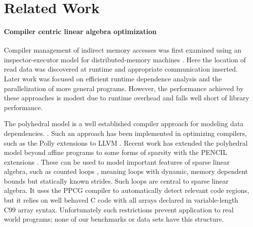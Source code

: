 \section{Related Work}
\label{sec:relatedwork}
\paragraph{Compiler centric linear algebra optimization} Compiler
management of indirect memory accesses was first examined using an
inspector-executor model for distributed-memory machines
\cite{Baxter:1989:RPS:72935.72967}. Here the location of read data was
discovered at runtime and appropriate communication inserted.  Later
work was focused on efficient runtime dependence analysis and the
parallelization of more general
programs\cite{pottenger1995idiom,fisher1994parallelizing,
rauchwerger1999lrpd,suganuma1996detection}.  However, the performance
achieved by these approaches is modest due to runtime 
overhead and falls well short of library performance.

The polyhedral model is a well  established compiler  approach  for modeling data dependencies.
\cite{redon1994scheduling, jouvelot1989unified,
chi1997optimizing, gupta2006simplifying, stock2014framework}.
Such an approach has been implemented in optimizing compilers, such as the Polly extensions to LLVM
\cite{Doerfert2015Polly}. %
Recent work has extended the polyhedral model beyond affine programs to some forms of sparsity with the
PENCIL extensions \cite{7429301}.
These can be used to model important features of sparse linear algebra, such as
counted loops \cite{Zhao:2018:PCF:3178372.3179509}, meaning loops with dynamic,
memory dependent bounds but statically known strides.
Such loops are central to sparse linear algebra.
It uses the PPCG compiler \cite{Verdoolaege:2013:PPC:2400682.2400713} to
automatically detect relevant code regions, but it relies on well behaved C code
with all arrays declared in variable-length C99 array syntax.
Unfortunately such restrictions prevent application to real world programs;
none of our benchmarks or data sets have this structure.

